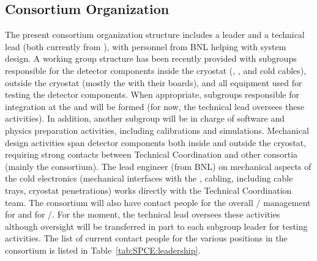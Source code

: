 
\subsection{Consortium Organization}
\label{sec:fdsp-tpcelec-management-consort}

The present consortium organization
structure includes a leader and a technical lead (both currently
from ), with personnel from BNL helping with system design. A working group structure has been recently 
provided with subgroups responsible for the detector 
components inside the cryostat (, , and
cold cables), outside the cryostat (mostly the  with 
their boards), and all equipment
used for testing the detector components. When appropriate, subgroups
responsible for integration at the  and
 will be formed (for now, the technical lead oversees 
these activities). In addition,
another subgroup will be in charge of software and physics
preparation activities, including calibrations and simulations.
Mechanical design activities span detector components both inside
and outside the cryostat, requiring strong contacts between 
Technical Coordination and other consortia (mainly the 
consortium). The lead engineer (from BNL) on mechanical aspects of the cold
electronics (mechanical interfaces with the , cabling, including 
cable trays, cryostat penetrations) works directly with
the Technical Coordination team. The  consortium will also have 
contact people for the overall / management for
 and for /. For the moment, the technical lead oversees these activities although oversight
will be transferred in part to each subgroup leader for testing
activities. The list of current contact people for the various 
positions in the consortium is listed in Table~\ref{tab:SPCE:leadership}.

